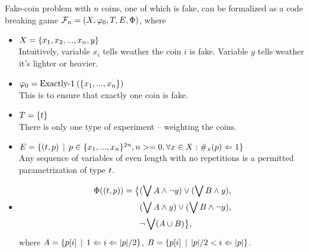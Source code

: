\begin{example}
Fake-coin problem with $n$ coins, one of which is fake, can be formalized as
a code breaking game
$\mathcal{F}_n = (X, \varphi_0, T, E, \Phi)$, where

\begin{itemize}
\item
$X = \{x_1, x_2, ..., x_n, y\}$ \\
Intuitively, variable $x_i$ tells weather the coin $i$ is fake.
Variable $y$ tells weather it's lighter or heavier.

\item
$\varphi_0 = \textrm{Exactly-1}\:(\{x_1, ..., x_n\})$ \\
This is to ensure that exactly one coin is fake.

\item
$T = \{t\}$ \\
There is only one type of experiment -- weighting the coins.

\item
$E = \{ (t, p) \:\:|\:\:
  p \in \{x_1, ..., x_n\}^{2n},
  n >= 0,
  \forall x\in X: \#_x(p)<=1 \} $\\
Any sequence of variables of even length with no repetitions
  is a permitted parametrization of type $t$.

\item
\begin{align*}
\Phi((t, p)) = \big\{
& (\bigvee A \wedge \neg y) \vee (\bigvee B \wedge y), \\
& (\bigvee A \wedge y) \vee (\bigvee B \wedge \neg y), \\
& \neg \bigvee(A\cup B) \big\},
\end{align*}
where
$A = \{ p[i] \:\:|\:\: 1 <= i <= |p|/2 \}$,
$B = \{ p[i] \:\:|\:\: |p|/2 < i <= |p| \}$.
\end{itemize}
\end{example}


